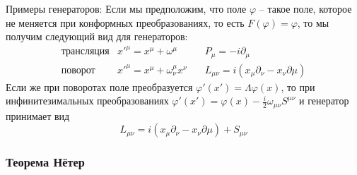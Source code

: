 \documentclass[a4paper,12pt]{article}
\theoremstyle{definition}
\theoremstyle{definition}
\theoremstyle{definition}
\begin{document}
Примеры генераторов:
Если мы предположим, что поле $\varphi$ -- такое поле, которое не меняется при конформных
преобразованиях, то есть $F(\varphi)=\varphi$, то мы получим следующий вид для генераторов: 
\begin{eqnarray}
  \label{eq:169}
  \mbox{трансляция}  & x'^{\mu}=x^{\mu}+\omega^{\mu}& \quad P_{\mu}=-i\partial_{\mu}\\
  \mbox{поворот} & x'^{\mu}=x^{\mu}+\omega^{\mu}_{\nu}x^{\nu} & \quad L_{\mu\nu}=i(x_{\mu}\partial_{\nu}-x_{\nu}\partial{\mu})
\end{eqnarray}
Если же при поворотах поле преобразуется $\varphi'(x')=\Lambda\varphi(x)$, то при инфинитезимальных
преобразованиях $\varphi'(x')=\varphi(x)-\frac{i}{2}\omega_{\mu\nu}S^{\mu\nu}$ и генератор принимает
вид 
\begin{equation*}
  L_{\mu\nu}=i(x_{\mu}\partial_{\nu}-x_{\nu}\partial{\mu})+S_{\mu\nu}
\end{equation*}

\subsubsection*{Теорема Нётер}
\label{sec:noether}
\end{document}
